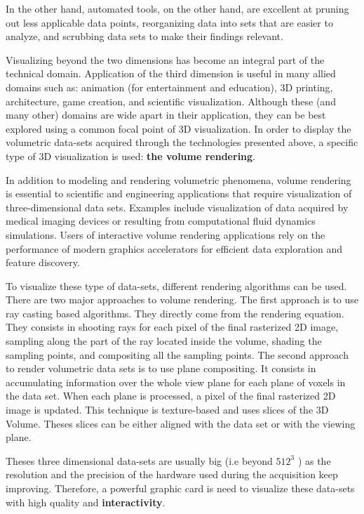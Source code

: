 In the other hand, automated tools, on the other hand, are excellent at pruning out less applicable data points, reorganizing data into sets that are easier to analyze, and scrubbing data sets to make their findings relevant.


Visualizing beyond the two dimensions has become an integral part of the technical domain. Application of the third dimension is useful in many allied domains such as: animation (for entertainment and education), 3D printing, architecture, game creation, and scientific visualization. Although these (and many other) domains are wide apart in their application, they can be best explored using a common focal point of 3D visualization. In order to display the volumetric data-sets acquired through the technologies presented above, a specific type of 3D visualization is used:  \textbf{the volume rendering}.



In addition to modeling and rendering volumetric phenomena, volume rendering is essential to scientific and engineering applications that require visualization of three-dimensional data sets. Examples include visualization of data acquired by medical imaging devices or resulting from computational fluid dynamics simulations. Users of interactive volume rendering applications rely on the performance of modern graphics accelerators for efficient data exploration and feature discovery.


To visualize these type of data-sets, different rendering algorithms can be used. There are two major approaches to volume rendering. The first approach is to use ray casting based algorithms. They directly come from the rendering equation. They consists in shooting rays for each pixel of the final rasterized 2D image, sampling along the part of the ray located inside the volume, shading the sampling points, and compositing all the sampling points.   
The second approach to render volumetric data sets is to use plane compositing. It consists in accumulating information over the whole view plane for each plane of voxels in the data set. When each plane is processed, a pixel of the final rasterized 2D image is updated. This technique is texture-based and uses slices of the 3D Volume. Theses slices can be either aligned with the data set or with the viewing plane.


Theses three dimensional data-sets are usually big (i.e beyond $512^{3}$ ) as the resolution and the precision of the hardware used during the acquisition keep improving. Therefore, a powerful graphic card is need to visualize these data-sets with high quality and \textbf{interactivity}. 

